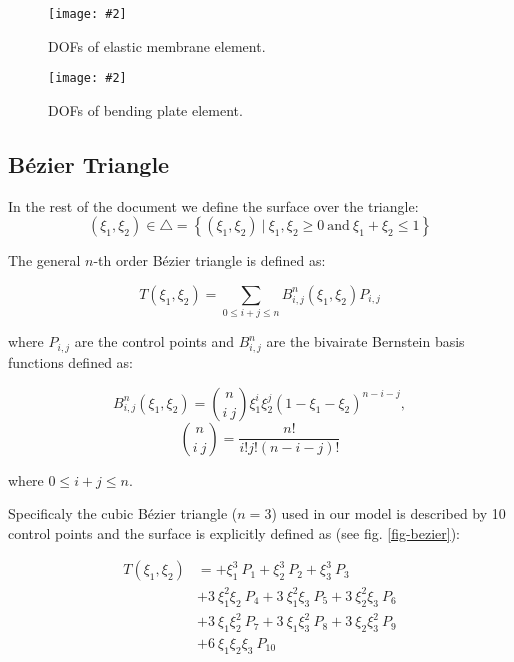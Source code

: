 \documentclass{egpubl}
\newcommand{\Figure}[3]{%
\begin{figure}[htb]
  \centering
  \texttt{[image: \#2]}
  \caption{\label{fig-#2}#3}
\end{figure}}
\begin{document}
\Figure{0.8\linewidth}{membrane}
{DOFs of elastic membrane element.}

\Figure{0.8\linewidth}{plate}
{DOFs of bending plate element.}

\subsection{Bézier Triangle} %

In the rest of the document we define the surface over the triangle:
\begin{equation}
    (\xi_1,\xi_2) \in \bigtriangleup = \left\{ (\xi_1,\xi_2)~|~\xi_1, \xi_2 \ge 0
        \mathrm{~and~} \xi_1+\xi_2 \le 1 \right\}
\end{equation}

The general $n$-th order Bézier triangle is defined as:

\begin{equation}
    T(\xi_1, \xi_2) = \sum_{0 \le i + j \le n} B^n_{i,j}(\xi_1,\xi_2) P_{i,j}
\end{equation}

\noindent
where $P_{i,j}$ are the control points and $B^n_{i,j}$ are the bivairate
Bernstein basis functions defined as:

\begin{equation}
  B^n_{i,j} (\xi_1,\xi_2) =
    \binom{n}{i~j} \xi_1^i \xi_2^j (1-\xi_1-\xi_2)^{n-i-j},
\end{equation}
\begin{equation}
  \binom{n}{i~j} = \frac{n!}{i!j!(n-i-j)!}
\end{equation}

\noindent
where $ 0 \le i+j \le n $.

Specificaly the cubic Bézier triangle ($n=3$) used in our model is
described by 10 control points and the surface is explicitly defined as (see
fig. \ref{fig-bezier}):

\begin{equation}\label{eq-cubicbez}
  \begin{split}
  T(\xi_1,\xi_2) & =
           + \xi_1^3\ P_1
           + \xi_2^3\ P_2
           + \xi_3^3\ P_3 \\
         & + 3\ \xi_1^2 \xi_2\ P_4
           + 3\ \xi_1^2 \xi_3\ P_5
           + 3\ \xi_2^2 \xi_3\ P_6 \\
         & + 3\ \xi_1 \xi_2^2\ P_7
           + 3\ \xi_1 \xi_3^2\ P_8
           + 3\ \xi_2 \xi_3^2\ P_9 \\
         & + 6\ \xi_1 \xi_2 \xi_3\ P_{10} \\
  \end{split}
\end{equation}
\end{document}
